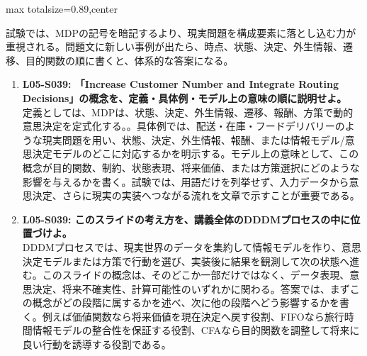 \begin{minipage}[t]{0.58\textwidth}
\begin{adjustbox}{max totalsize={\textwidth}{0.89\textheight},center}
\begin{minipage}{\textwidth}
試験では、MDPの記号を暗記するより、現実問題を構成要素に落とし込む力が重視される。問題文に新しい事例が出たら、時点、状態、決定、外生情報、遷移、目的関数の順に書くと、体系的な答案になる。\par{}\begin{enumerate}\item \textbf{L05-S039: 「Increase Customer Number and Integrate Routing Decisions」の概念を、定義・具体例・モデル上の意味の順に説明せよ。}\\定義としては、MDPは、状態、決定、外生情報、遷移、報酬、方策で動的意思決定を定式化する。。具体例では、配送・在庫・フードデリバリーのような現実問題を用い、状態、決定、外生情報、報酬、または情報モデル/意思決定モデルのどこに対応するかを明示する。モデル上の意味として、この概念が目的関数、制約、状態表現、将来価値、または方策選択にどのような影響を与えるかを書く。試験では、用語だけを列挙せず、入力データから意思決定、さらに現実の実装へつながる流れを文章で示すことが重要である。\item \textbf{L05-S039: このスライドの考え方を、講義全体のDDDMプロセスの中に位置づけよ。}\\DDDMプロセスでは、現実世界のデータを集約して情報モデルを作り、意思決定モデルまたは方策で行動を選び、実装後に結果を観測して次の状態へ進む。このスライドの概念は、そのどこか一部だけではなく、データ表現、意思決定、将来不確実性、計算可能性のいずれかに関わる。答案では、まずこの概念がどの段階に属するかを述べ、次に他の段階へどう影響するかを書く。例えば価値関数なら将来価値を現在決定へ戻す役割、FIFOなら旅行時間情報モデルの整合性を保証する役割、CFAなら目的関数を調整して将来に良い行動を誘導する役割である。\end{enumerate}
\end{minipage}
\end{adjustbox}
\end{minipage}



